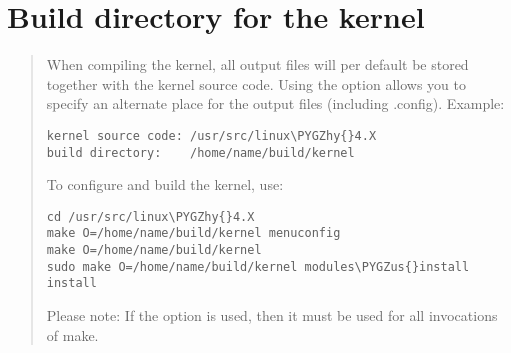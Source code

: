 \documentclass[a4paper,8pt,english]{sphinxmanual}
\def\PYGZus{\char`\_}
\def\PYGZhy{\char`\-}
\begin{document}
\section{Build directory for the kernel}
\label{admin-guide/README:build-directory-for-the-kernel}\begin{quote}

When compiling the kernel, all output files will per default be
stored together with the kernel source code.
Using the option  allows you to specify an alternate
place for the output files (including .config).
Example:

\begin{Verbatim}[commandchars=\\\{\}]
kernel source code: /usr/src/linux\PYGZhy{}4.X
build directory:    /home/name/build/kernel
\end{Verbatim}

To configure and build the kernel, use:

\begin{Verbatim}[commandchars=\\\{\}]
cd /usr/src/linux\PYGZhy{}4.X
make O=/home/name/build/kernel menuconfig
make O=/home/name/build/kernel
sudo make O=/home/name/build/kernel modules\PYGZus{}install install
\end{Verbatim}

Please note: If the  option is used, then it must be
used for all invocations of make.
\end{quote}
\end{document}
